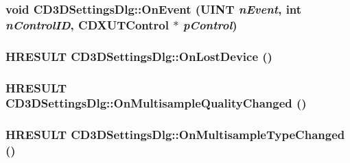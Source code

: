 \label{class_c_d3_d_settings_dlg_a6e9145611a264f08597503e32a51aeea}
\hypertarget{class_c_d3_d_settings_dlg_a8ba617f0440a4647d0697e0dadb373b4}{
\subsubsection[{OnEvent}]{\setlength{\rightskip}{0pt plus 5cm}void CD3DSettingsDlg::OnEvent (UINT {\em nEvent}, \/  {\bf int} {\em nControlID}, \/  {\bf CDXUTControl} $\ast$ {\em pControl})}}
\label{class_c_d3_d_settings_dlg_a8ba617f0440a4647d0697e0dadb373b4}
\hypertarget{class_c_d3_d_settings_dlg_a9cf75243457ad7f0b8c179bacc93cbdc}{
\subsubsection[{OnLostDevice}]{\setlength{\rightskip}{0pt plus 5cm}HRESULT CD3DSettingsDlg::OnLostDevice ()}}
\label{class_c_d3_d_settings_dlg_a9cf75243457ad7f0b8c179bacc93cbdc}
\hypertarget{class_c_d3_d_settings_dlg_ad4f5ee2ea8bc3d590fb7748987af28e6}{
\subsubsection[{OnMultisampleQualityChanged}]{\setlength{\rightskip}{0pt plus 5cm}HRESULT CD3DSettingsDlg::OnMultisampleQualityChanged ()}}
\label{class_c_d3_d_settings_dlg_ad4f5ee2ea8bc3d590fb7748987af28e6}
\hypertarget{class_c_d3_d_settings_dlg_a5979860f92903f58815328188bb2255f}{
\subsubsection[{OnMultisampleTypeChanged}]{\setlength{\rightskip}{0pt plus 5cm}HRESULT CD3DSettingsDlg::OnMultisampleTypeChanged ()}}
